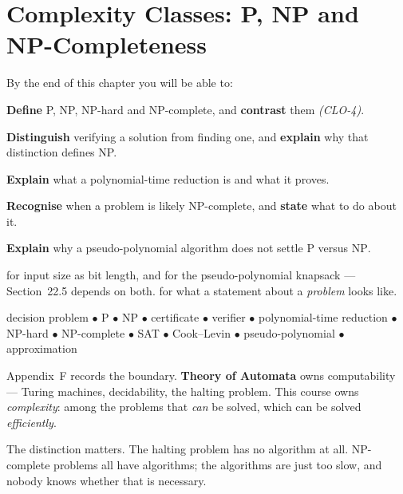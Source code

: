 \chapter{Complexity Classes: P, NP and NP-Completeness}\label{ch:complexity}

\begin{outcomes}
By the end of this chapter you will be able to:
\begin{tight}
  \item \textbf{Define} P, NP, NP-hard and NP-complete, and \textbf{contrast}
        them \emph{(CLO-4)}.
  \item \textbf{Distinguish} verifying a solution from finding one, and
        \textbf{explain} why that distinction defines NP.
  \item \textbf{Explain} what a polynomial-time reduction is and what it proves.
  \item \textbf{Recognise} when a problem is likely NP-complete, and
        \textbf{state} what to do about it.
  \item \textbf{Explain} why a pseudo-polynomial algorithm does not settle
        $\mathrm{P}$ versus $\mathrm{NP}$.
\end{tight}
\end{outcomes}

\begin{prereq}
 for input size as bit length, and  for the
pseudo-polynomial knapsack --- Section~22.5 depends on both. 
for what a statement about a \emph{problem} looks like.
\end{prereq}

\begin{keyterms}
decision problem $\bullet$ P $\bullet$ NP $\bullet$ certificate $\bullet$
verifier $\bullet$ polynomial-time reduction $\bullet$ NP-hard $\bullet$
NP-complete $\bullet$ SAT $\bullet$ Cook--Levin $\bullet$
pseudo-polynomial $\bullet$ approximation
\end{keyterms}

\begin{alertbox}
Appendix~F records the boundary. \textbf{Theory of Automata} owns
computability --- Turing machines, decidability, the halting problem. This
course owns \emph{complexity}: among the problems that \emph{can} be solved,
which can be solved \emph{efficiently}.

\smallskip
The distinction matters. The halting problem has no algorithm at all.
NP-complete problems all have algorithms; the algorithms are just too slow, and
nobody knows whether that is necessary.
\end{alertbox}


